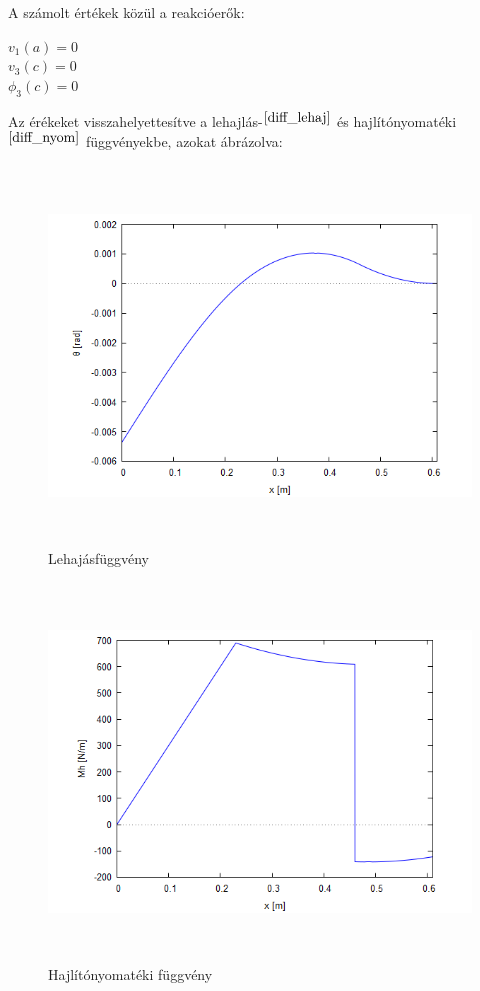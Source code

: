\documentclass{article}
\begin{document}
		A számolt értékek közül a reakcióerők:
		\begin{center}
			$v_1(a)=0$\\
			$v_3(c)=0$\\
			$\phi_3(c)=0$\\
		\end{center}
		Az érékeket visszahelyettesítve a lehajlás-$^{\ref{diff_lehaj}}$ és hajlítónyomatéki$^{\ref{diff_nyom}}$ függvényekbe, azokat ábrázolva: 
		\begin{figure}[h!]
			\begin{center}
				\includegraphics[height=10cm]{images/diff_lehaj}
			\end{center}
			\caption{Lehajásfüggvény}
			\label{diff_lehaj}
		\end{figure}
		\begin{figure}[h!]
			\begin{center}
				\includegraphics[height=10cm]{images/diff_nyomatek}
			\end{center}
			\caption{Hajlítónyomatéki függvény}
			\label{diff_nyom}
		\end{figure}
\end{document}
